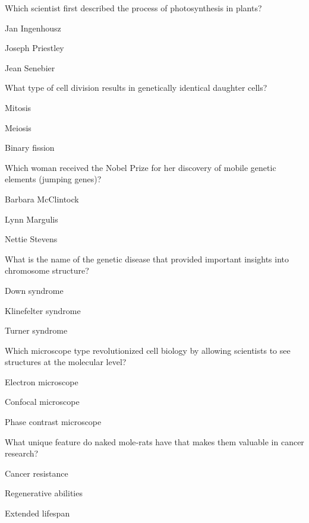 \begin{enhancedmcq}{Which scientist first described the process of photosynthesis in plants?}
\item Jan Ingenhousz
\item Joseph Priestley
\item Jean Senebier

\end{enhancedmcq}
\begin{enhancedmcq}{What type of cell division results in genetically identical daughter cells?}
\item Mitosis
\item Meiosis
\item Binary fission

\end{enhancedmcq}
\begin{enhancedmcq}{Which woman received the Nobel Prize for her discovery of mobile genetic elements (jumping genes)?}
\item Barbara McClintock
\item Lynn Margulis
\item Nettie Stevens

\end{enhancedmcq}
\begin{enhancedmcq}{What is the name of the genetic disease that provided important insights into chromosome structure?}
\item Down syndrome
\item Klinefelter syndrome
\item Turner syndrome

\end{enhancedmcq}
\begin{enhancedmcq}{Which microscope type revolutionized cell biology by allowing scientists to see structures at the molecular level?}
\item Electron microscope
\item Confocal microscope
\item Phase contrast microscope

\end{enhancedmcq}
\begin{enhancedmcq}{What unique feature do naked mole‑rats have that makes them valuable in cancer research?}
\item Cancer resistance
\item Regenerative abilities
\item Extended lifespan

\end{enhancedmcq}
